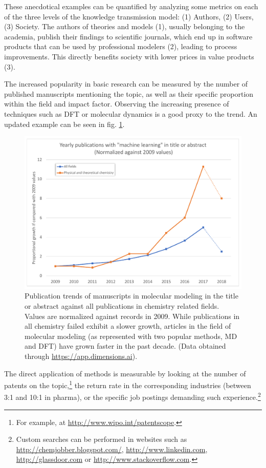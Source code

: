 These anecdotical examples can be quantified by analyzing some metrics on each of the three levels of the knowledge transmission model:\cite{warry2006} (1) Authors, (2) Users, (3) Society. The authors of theories and models (1), usually belonging to the academia, publish their findings to scientific journals, which end up in software products that can be used by professional modelers (2), leading to process improvements. This directly benefits society with lower prices in value products (3).

The increased popularity in basic research can be measured by the number of published manuscripts mentioning the topic, as well as their specific proportion within the field and impact factor. Observing the increasing presence of techniques such as DFT or molecular dynamics is a good proxy to the trend.\cite{maginn2009} An updated example can be seen in fig. \ref{fig:pubtrends}.


\begin{figure}[H]
	\includegraphics[width=\textwidth]{./figures/01/publication-trends_crop.pdf}
	\caption[Publication trends in molecular modeling]{Publication trends of manuscripts in molecular modeling in the title or abstract against all publications in chemistry related fields. Values are normalized against records in 2009. While publications in all chemistry failed exhibit a slower growth, articles in the field of molecular modeling (as represented with two popular methods, MD and DFT) have grown faster in the past decade. (Data obtained through \url{https://app.dimensions.ai}).}
	\label{fig:pubtrends}
\end{figure}


The direct application of methods is measurable by looking at the number of patents on the topic,\footnote{For example, at \url{http://www.wipo.int/patentscope}.} the return rate in the corresponding industries (between 3:1 and 10:1 in pharma\cite{accelryswhitepaper}), or the specific job postings demanding such experience.\footnote{Custom searches can be performed in websites such as \url{http://chemjobber.blogspot.com/}, \url{http://www.linkedin.com}, \url{http://glassdoor.com} or \url{http://www.stackoverflow.com}.}

